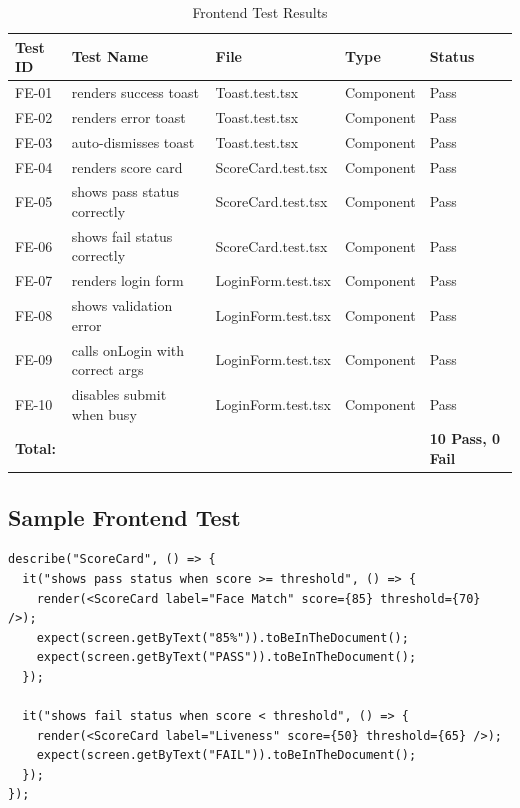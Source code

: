 \begin{table}[H]
\centering
\caption{Frontend Test Results}
\begin{tabular}{@{}lllll@{}}
\toprule
\textbf{Test ID} & \textbf{Test Name} & \textbf{File} & \textbf{Type} & \textbf{Status} \\
\midrule
FE-01 & renders success toast & Toast.test.tsx & Component & Pass \\
FE-02 & renders error toast & Toast.test.tsx & Component & Pass \\
FE-03 & auto-dismisses toast & Toast.test.tsx & Component & Pass \\
FE-04 & renders score card & ScoreCard.test.tsx & Component & Pass \\
FE-05 & shows pass status correctly & ScoreCard.test.tsx & Component & Pass \\
FE-06 & shows fail status correctly & ScoreCard.test.tsx & Component & Pass \\
FE-07 & renders login form & LoginForm.test.tsx & Component & Pass \\
FE-08 & shows validation error & LoginForm.test.tsx & Component & Pass \\
FE-09 & calls onLogin with correct args & LoginForm.test.tsx & Component & Pass \\
FE-10 & disables submit when busy & LoginForm.test.tsx & Component & Pass \\
\midrule
\multicolumn{4}{l}{\textbf{Total:}} & \textbf{10 Pass, 0 Fail} \\
\bottomrule
\end{tabular}
\end{table}

\subsection{Sample Frontend Test}

\begin{lstlisting}[style=tsstyle, caption=ScoreCard Component Test]
describe("ScoreCard", () => {
  it("shows pass status when score >= threshold", () => {
    render(<ScoreCard label="Face Match" score={85} threshold={70} />);
    expect(screen.getByText("85%")).toBeInTheDocument();
    expect(screen.getByText("PASS")).toBeInTheDocument();
  });

  it("shows fail status when score < threshold", () => {
    render(<ScoreCard label="Liveness" score={50} threshold={65} />);
    expect(screen.getByText("FAIL")).toBeInTheDocument();
  });
});
\end{lstlisting}

